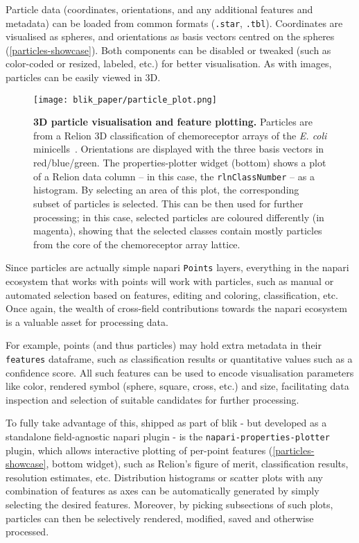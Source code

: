 Particle data (coordinates, orientations, and any additional features and metadata) can be loaded from common formats (\texttt{.star}, \texttt{.tbl}). Coordinates are visualised as spheres, and orientations as basis vectors centred on the spheres (\autoref{particles-showcase}). Both components can be disabled or tweaked (such as color-coded or resized, labeled, etc.) for better visualisation. As with images, particles can be easily viewed in 3D.

\begin{figure}[!ht]
    \centering
    \texttt{[image: blik\_paper/particle\_plot.png]}
    \caption[3D particle visualisation and feature plotting]{\textbf{3D particle visualisation and feature plotting.} Particles are from a Relion 3D classification of chemoreceptor arrays of the \textit{E. coli} minicells~\cite{burtCompleteStructureChemosensory2020}. Orientations are displayed with the three basis vectors in red/blue/green. The properties-plotter widget (bottom) shows a plot of a Relion data column -- in this case, the \texttt{rlnClassNumber} -- as a histogram. By selecting an area of this plot, the corresponding subset of particles is selected. This can be then used for further processing; in this case, selected particles are coloured differently (in magenta), showing that the selected classes contain mostly particles from the core of the chemoreceptor array lattice.}
    \label{particles-showcase}
\end{figure}

Since particles are actually simple napari \texttt{Points} layers, everything in the napari ecosystem that works with points will work with particles, such as manual or automated selection based on features, editing and coloring, classification, etc. Once again, the wealth of cross-field contributions towards the napari ecosystem is a valuable asset for processing data.

For example, points (and thus particles) may hold extra metadata in their \texttt{features} dataframe, such as classification results or quantitative values such as a confidence score. All such features can be used to encode visualisation parameters like color, rendered symbol (sphere, square, cross, etc.) and size, facilitating data inspection and selection of suitable candidates for further processing.

To fully take advantage of this, shipped as part of blik - but developed as a standalone field-agnostic napari plugin - is the \texttt{napari-properties-plotter} plugin, which allows interactive plotting of per-point features (\autoref{particles-showcase}, bottom widget), such as Relion's figure of merit, classification results, resolution estimates, etc. Distribution histograms or scatter plots with any combination of features as axes can be automatically generated by simply selecting the desired features. Moreover, by picking subsections of such plots, particles can then be selectively rendered, modified, saved and otherwise processed.


